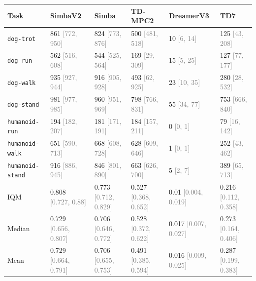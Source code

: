 \begin{tabular}{llllll}
\toprule
\textbf{Task} & \textbf{SimbaV2} & \textbf{Simba} & \textbf{TD-MPC2} & \textbf{DreamerV3} & \textbf{TD7} \\
\midrule
\texttt{dog-trot} & 861 \textcolor{gray}{[772, 950]} & 824 \textcolor{gray}{[773, 876]} & 500 \textcolor{gray}{[481, 518]} & 10 \textcolor{gray}{[6, 14]} & 125 \textcolor{gray}{[43, 208]} \\
\texttt{dog-run} & 562 \textcolor{gray}{[516, 608]} & 544 \textcolor{gray}{[525, 564]} & 169 \textcolor{gray}{[29, 309]} & 15 \textcolor{gray}{[5, 25]} & 127 \textcolor{gray}{[77, 177]} \\
\texttt{dog-walk} & 935 \textcolor{gray}{[927, 944]} & 916 \textcolor{gray}{[905, 928]} & 493 \textcolor{gray}{[62, 925]} & 23 \textcolor{gray}{[10, 35]} & 280 \textcolor{gray}{[28, 532]} \\
\texttt{dog-stand} & 981 \textcolor{gray}{[977, 985]} & 960 \textcolor{gray}{[951, 969]} & 798 \textcolor{gray}{[766, 831]} & 55 \textcolor{gray}{[34, 77]} & 753 \textcolor{gray}{[666, 840]} \\
\texttt{humanoid-run} & 194 \textcolor{gray}{[182, 207]} & 181 \textcolor{gray}{[171, 191]} & 184 \textcolor{gray}{[157, 211]} & 0 \textcolor{gray}{[0, 1]} & 79 \textcolor{gray}{[16, 142]} \\
\texttt{humanoid-walk} & 651 \textcolor{gray}{[590, 713]} & 668 \textcolor{gray}{[608, 728]} & 628 \textcolor{gray}{[609, 646]} & 1 \textcolor{gray}{[0, 1]} & 252 \textcolor{gray}{[43, 462]} \\
\texttt{humanoid-stand} & 916 \textcolor{gray}{[886, 945]} & 846 \textcolor{gray}{[801, 890]} & 663 \textcolor{gray}{[626, 700]} & 5 \textcolor{gray}{[2, 7]} & 389 \textcolor{gray}{[65, 713]} \\
IQM & 0.808 \textcolor{gray}{[0.727, 0.88]} & 0.773 \textcolor{gray}{[0.712, 0.829]} & 0.527 \textcolor{gray}{[0.368, 0.652]} & 0.01 \textcolor{gray}{[0.004, 0.019]} & 0.216 \textcolor{gray}{[0.112, 0.358]} \\
Median & 0.729 \textcolor{gray}{[0.656, 0.807]} & 0.706 \textcolor{gray}{[0.646, 0.772]} & 0.528 \textcolor{gray}{[0.372, 0.622]} & 0.017 \textcolor{gray}{[0.007, 0.027]} & 0.273 \textcolor{gray}{[0.164, 0.406]} \\
Mean & 0.729 \textcolor{gray}{[0.664, 0.791]} & 0.706 \textcolor{gray}{[0.655, 0.753]} & 0.491 \textcolor{gray}{[0.385, 0.594]} & 0.016 \textcolor{gray}{[0.009, 0.025]} & 0.287 \textcolor{gray}{[0.199, 0.383]} \\
\bottomrule
\end{tabular}
